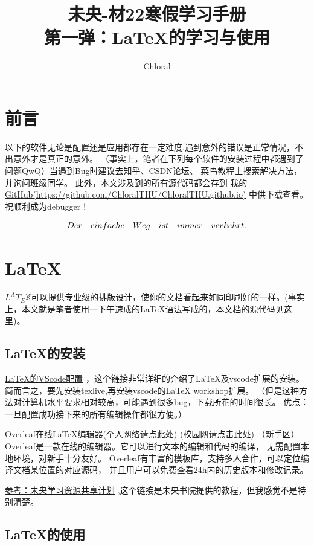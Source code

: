 \documentclass[a4paper,20pt]{article}
\title{未央-材22寒假学习手册\\第一弹：LaTeX的学习与使用}
\author{Chloral}
\begin{document}
\maketitle
\section{前言}
以下的软件无论是配置还是应用都存在一定难度,遇到意外的错误是正常情况，不出意外才是真正的意外。
（事实上，笔者在下列每个软件的安装过程中都遇到了问题QwQ）当遇到Bug时建议去知乎、CSDN论坛、
菜鸟教程上搜索解决方法，并询问班级同学。
此外，本文涉及到的所有源代码都会存到
\href{https://github.com/ChloralTHU/ChloralTHU.github.io}
{我的GitHub(https://github.com/ChloralTHU/ChloralTHU.github.io)}
中供下载查看。祝顺利成为debugger！\par
$$ {Der \quad einfache \quad Weg \quad ist \quad immer \quad verkehrt.}\tt $$


\section{LaTeX}
$ L^AT_E\mathbb{X} $可以提供专业级的排版设计，使你的文档看起来如同印刷好的一样。(事实上，本文就是笔者使用一下午速成的LaTeX语法写成的，本文档的源代码见\href{https://github.com/ChloralTHU/ChloralTHU.github.io}{这里})。\par
\subsection{LaTeX的安装}
\href{https://zhuanlan.zhihu.com/p/166523064}{LaTeX的VScode配置}
，这个链接非常详细的介绍了LaTeX及vscode扩展的安装。
简而言之，要先安装texlive,再安装vscode的LaTeX workshop扩展。
（但是这种方法对计算机水平要求相对较高，可能遇到很多bug，下载所花的时间很长。
优点：一旦配置成功接下来的所有编辑操作都很方便。）\par 
\href{https://cn.overleaf.com/}{Overleaf在线LaTeX编辑器(个人网络请点此处)}
\href{https://overleaf.tsinghua.edu.cn//}{(校园网请点击此处)}
（新手区）Overleaf是一款在线的编辑器。它可以进行文本的编辑和代码的编译，
无需配置本地环境，对新手十分友好。
Overleaf有丰富的模板库，支持多人合作，可以定位编译文档某位置的对应源码，
并且用户可以免费查看24h内的历史版本和修改记录。\par
\href{https://mp.weixin.qq.com/s/LoDPXa9BpFCEu2z-_sKZmg}{参考：未央学习资源共享计划}
,这个链接是未央书院提供的教程，但我感觉不是特别清楚。\par
\subsection{LaTeX的使用}
\end{document}
